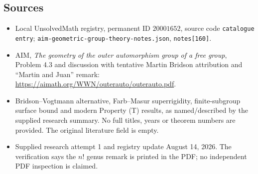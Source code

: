 \documentclass[11pt]{article}
\begin{document}
\subsection{Sources}
\begin{itemize}
\item Local UnsolvedMath registry, permanent ID \(20001652\), source code \texttt{catalogue entry}; \texttt{aim-geometric-group-theory-notes.json}, \texttt{notes[160]}.
\item AIM, \emph{The geometry of the outer automorphism group of a free group}, Problem 4.3 and discussion with tentative Martin Bridson attribution and ``Martin and Juan'' remark: \url{https://aimath.org/WWN/outerauto/outerauto.pdf}.
\item Bridson--Vogtmann alternative, Farb--Masur superrigidity, finite-subgroup surface bound and modern Property (T) results, as named/described by the supplied research summary. No full titles, years or theorem numbers are provided. The original literature field is empty.
\item Supplied research attempt 1 and registry update August 14, 2026. The verification says the \(n!\) genus remark is printed in the PDF; no independent PDF inspection is claimed.
\end{itemize}
\end{document}
